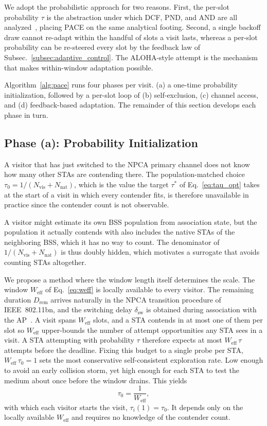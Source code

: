 \documentclass[journal,10pt]{IEEEtran}
\newcommand{\Nvis}{N_\mathrm{vis}}
\newcommand{\Nnat}{N_\mathrm{nat}}
\begin{document}
We adopt the probabilistic approach for two reasons. First, the per-slot probability $\tau$ is the abstraction under which DCF, PND, and AND are all analyzed~\cite{bianchi2000performance,song2014pnd,vasudevan2013efficient}, placing PACE on the same analytical footing. Second, a single backoff draw cannot re-adapt within the handful of slots a visit lasts, whereas a per-slot probability can be re-steered every slot by the feedback law of Subsec.~\ref{subsec:adaptive_control}. The ALOHA-style attempt is the mechanism that makes within-window adaptation possible.

Algorithm~\ref{alg:pace} runs four phases per visit. (a) a one-time probability
initialization, followed by a per-slot loop of (b) self-exclusion, (c) channel
access, and (d) feedback-based adaptation. The remainder of this section develops
each phase in turn.

\subsection{Phase (a): Probability Initialization}
\label{subsec:init}

A visitor that has just switched to the NPCA primary channel does not know how
many other STAs are contending there. The population-matched choice
$\tau_0=1/(\Nvis{+}\Nnat)$, which is the value the target $\tau^*$ of Eq.~\eqref{eq:tau_opt} takes at the start of a visit in which every contender fits, is therefore unavailable in practice since the contender count is not observable.

A visitor might estimate its own BSS population from association state, but the population it actually contends with also includes the native STAs of the neighboring BSS, which it has no way to count. The denominator of $1/(\Nvis{+}\Nnat)$ is thus doubly hidden, which motivates a surrogate that avoids counting STAs altogether.

We propose a method where the window length itself determines the scale. The window $W_\mathrm{eff}$ of Eq.~\eqref{eq:weff} is locally available to every visitor. The remaining duration $D_\mathrm{rem}$ arrives naturally in the NPCA transition procedure of IEEE~802.11bn, and the switching delay $\delta_\mathrm{sw}$ is obtained during association with the AP~\cite{ieee80211bn}. A visit spans $W_\mathrm{eff}$ slots, and a STA contends in at most one of them per slot so $W_\mathrm{eff}$ upper-bounds the number of attempt opportunities any STA sees in a visit. A STA attempting with probability $\tau$ therefore expects at most $W_\mathrm{eff}\,\tau$ attempts before the deadline. Fixing this budget to a single probe per STA, $W_\mathrm{eff}\,\tau_0 = 1$ sets the most conservative self-consistent  exploration rate. Low enough to avoid an early collision storm, yet high enough for each STA to test the medium about once before the window drains. This yields
\begin{equation}
    \tau_0 = \frac{1}{W_\mathrm{eff}},
    \label{eq:init}
\end{equation}
with which each visitor starts the visit, $\tau_i(1)=\tau_0$. It depends only on the locally available $W_\mathrm{eff}$ and requires no knowledge of the contender count.
\end{document}
